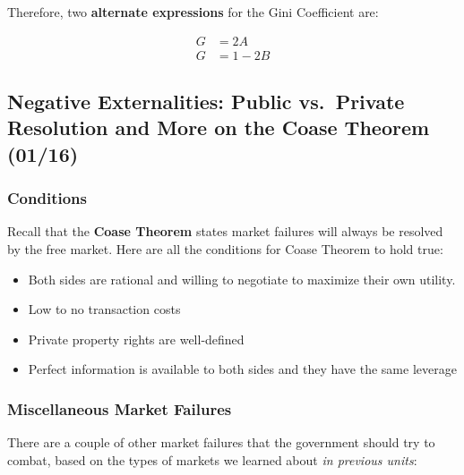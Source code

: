 \documentclass[
  letterpaper,
  DIV=11,
  numbers=noendperiod]{scrartcl}
\providecommand{\tightlist}{%
  \setlength{\itemsep}{0pt}\setlength{\parskip}{0pt}}\usepackage{longtable,booktabs,array}
\begin{document}
Therefore, two \textbf{alternate expressions} for the Gini Coefficient
are:

\begin{align}
G &= 2A \\
G &= 1-2B
\end{align}

\newpage{}

\hypertarget{negative-externalities-public-vs.-private-resolution-and-more-on-the-coase-theorem-0116}{%
\subsection{Negative Externalities: Public vs.~Private Resolution and
More on the Coase Theorem
(01/16)}\label{negative-externalities-public-vs.-private-resolution-and-more-on-the-coase-theorem-0116}}

\hypertarget{conditions}{%
\subsubsection{Conditions}\label{conditions}}

Recall that the \textbf{Coase Theorem} states market failures will
always be resolved by the free market. Here are all the conditions for
Coase Theorem to hold true:

\begin{itemize}
\tightlist
\item
  Both sides are rational and willing to negotiate to maximize their own
  utility.
\item
  Low to no transaction costs
\item
  Private property rights are well-defined
\item
  Perfect information is available to both sides and they have the same
  leverage
\end{itemize}

\hypertarget{miscellaneous-market-failures}{%
\subsubsection{Miscellaneous Market
Failures}\label{miscellaneous-market-failures}}

There are a couple of other market failures that the government should
try to combat, based on the types of markets we learned about \emph{in
previous units}:
\end{document}
